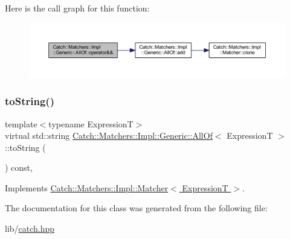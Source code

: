 Here is the call graph for this function\+:\nopagebreak
\begin{figure}[H]
\begin{center}
\leavevmode
\includegraphics[width=350pt]{class_catch_1_1_matchers_1_1_impl_1_1_generic_1_1_all_of_aca6497aaa7fdb6560ebe850f32ccbf15_cgraph}
\end{center}
\end{figure}
\hypertarget{class_catch_1_1_matchers_1_1_impl_1_1_generic_1_1_all_of_a8c8e7742501dc81e51a3c745d6f74119}{}\label{class_catch_1_1_matchers_1_1_impl_1_1_generic_1_1_all_of_a8c8e7742501dc81e51a3c745d6f74119} 
\subsubsection{\texorpdfstring{to\+String()}{toString()}}
{\footnotesize\ttfamily template$<$typename ExpressionT$>$ \\
virtual std\+::string \hyperlink{class_catch_1_1_matchers_1_1_impl_1_1_generic_1_1_all_of}{Catch\+::\+Matchers\+::\+Impl\+::\+Generic\+::\+All\+Of}$<$ ExpressionT $>$\+::to\+String (\begin{DoxyParamCaption}{ }\end{DoxyParamCaption}) const\hspace{0.3cm}{\ttfamily [inline]}, {\ttfamily [virtual]}}



Implements \hyperlink{struct_catch_1_1_matchers_1_1_impl_1_1_matcher_a091bcc37e589967d7e10fc7790d820e2}{Catch\+::\+Matchers\+::\+Impl\+::\+Matcher$<$ Expression\+T $>$}.



The documentation for this class was generated from the following file\+:\begin{DoxyCompactItemize}
\item 
lib/\hyperlink{catch_8hpp}{catch.\+hpp}\end{DoxyCompactItemize}
